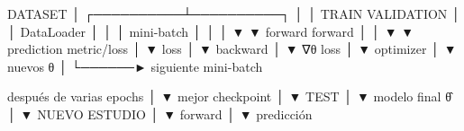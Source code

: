 \documentclass[
  letterpaper,
  DIV=11,
  numbers=noendperiod]{scrartcl}
\newenvironment{Shaded}{\begin{snugshade}}{\end{snugshade}}
\newcommand{\NormalTok}[1]{\textcolor[rgb]{0.00,0.23,0.31}{#1}}
\begin{document}
\begin{Shaded}
\begin{Highlighting}[]
\NormalTok{                           DATASET}
\NormalTok{                              │}
\NormalTok{                   ┌──────────┴──────────┐}
\NormalTok{                   │                     │}
\NormalTok{                TRAIN                VALIDATION}
\NormalTok{                   │                     │}
\NormalTok{               DataLoader                │}
\NormalTok{                   │                     │}
\NormalTok{               mini{-}batch                │}
\NormalTok{                   │                     │}
\NormalTok{                   ▼                     ▼}
\NormalTok{                forward               forward}
\NormalTok{                   │                     │}
\NormalTok{                   ▼                     ▼}
\NormalTok{               prediction             metric/loss}
\NormalTok{                   │}
\NormalTok{                   ▼}
\NormalTok{                  loss}
\NormalTok{                   │}
\NormalTok{                   ▼}
\NormalTok{                backward}
\NormalTok{                   │}
\NormalTok{                   ▼}
\NormalTok{                ∇θ loss}
\NormalTok{                   │}
\NormalTok{                   ▼}
\NormalTok{               optimizer}
\NormalTok{                   │}
\NormalTok{                   ▼}
\NormalTok{               nuevos θ}
\NormalTok{                   │}
\NormalTok{                   └──────► siguiente mini{-}batch}

\NormalTok{                   después de varias epochs}
\NormalTok{                              │}
\NormalTok{                              ▼}
\NormalTok{                        mejor checkpoint}
\NormalTok{                              │}
\NormalTok{                              ▼}
\NormalTok{                            TEST}
\NormalTok{                              │}
\NormalTok{                              ▼}
\NormalTok{                       modelo final θ̂}
\NormalTok{                              │}
\NormalTok{                              ▼}
\NormalTok{                         NUEVO ESTUDIO}
\NormalTok{                              │}
\NormalTok{                              ▼}
\NormalTok{                           forward}
\NormalTok{                              │}
\NormalTok{                              ▼}
\NormalTok{                         predicción}
\end{Highlighting}
\end{Shaded}
\end{document}
